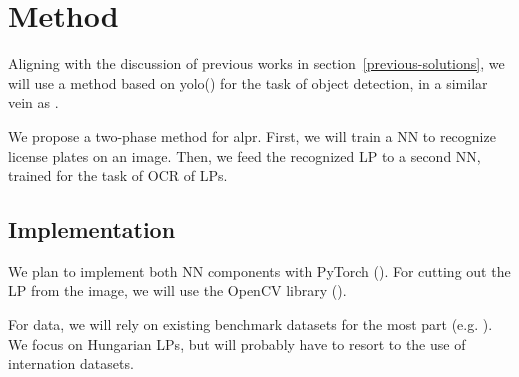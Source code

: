 \section{Method}
\label{method}


Aligning with the discussion of previous works in
section~\ref{previous-solutions}, we will use
a method based on \ac{yolo}(\cite{redmon2016look}) for the task of object
detection, in a similar vein as \cite{DBLP:journals/corr/abs-1909-01754}. 

We propose a two-phase method for \ac{alpr}. First, we will train a \ac{NN} to
recognize license plates on an image. Then, we feed the recognized \ac{LP} to
a second \ac{NN}, trained for the task of \ac{OCR} of \ac{LP}s.

\subsection{Implementation}
We plan to implement both \ac{NN} components with PyTorch (\cite{pytorch}).
For cutting out the \ac{LP} from the image, we will use the OpenCV library
(\cite{opencv}).

For data, we will rely on existing benchmark datasets for the most part (e.g.
\cite{DBLP:journals/corr/GoncalvesSMS16}). We focus on Hungarian \ac{LP}s, but
will probably have to resort to the use of internation datasets.

